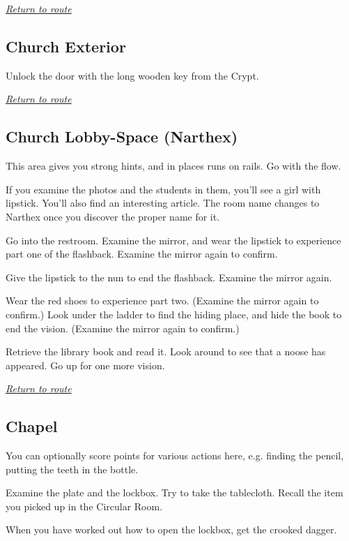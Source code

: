 \documentclass[a5paper]{extarticle}
\begin{document}
\hyperref[sec:route-7]{\emph{Return to route}}

\newpage
\subsection{Church Exterior}\label{sec:sol-Church-Exterior}

Unlock the door with the long wooden key from the Crypt.

\hyperref[sec:route-7]{\emph{Return to route}}

\newpage
\subsection{Church Lobby-Space (Narthex)}\label{sec:sol-Church-Lobby-Space}

This area gives you strong hints, and in places runs on rails. Go with the flow.

If you examine the photos and the students in them, you'll see a girl with lipstick.
You'll also find an interesting article.
The room name changes to Narthex once you discover the proper name for it.

Go into the restroom. Examine the mirror, and wear the lipstick to experience
part one of the flashback. Examine the mirror again to confirm.

Give the lipstick to the nun to end the flashback. Examine the mirror again.

Wear the red shoes to experience part two. (Examine the mirror again to confirm.)
Look under the ladder to find the hiding place, and hide the book to end the vision.
(Examine the mirror again to confirm.)

Retrieve the library book and read it.
Look around to see that a noose has appeared.
Go up for one more vision.

\hyperref[sec:route-7]{\emph{Return to route}}

\newpage
\subsection{Chapel}\label{sec:sol-Chapel}

You can optionally score points for various actions here, e.g. finding the pencil,
putting the teeth in the bottle.

Examine the plate and the lockbox. Try to take the tablecloth.
Recall the item you picked up in the Circular Room.

When you have worked out how to open the lockbox, get the crooked dagger.
\end{document}
